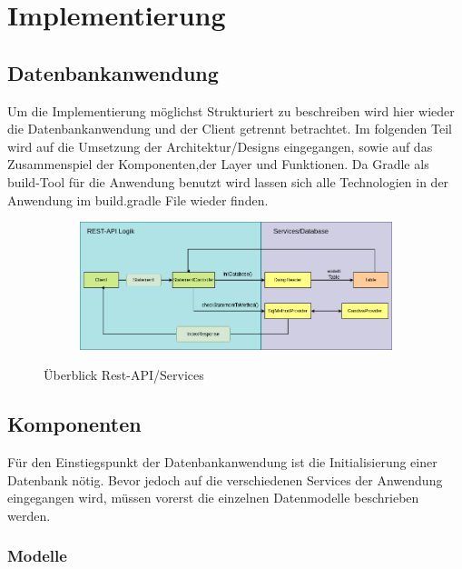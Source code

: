 \chapter{Implementierung}


\section{Datenbankanwendung}

Um die Implementierung möglichst Strukturiert zu beschreiben wird hier wieder die Datenbankanwendung und der Client getrennt betrachtet.
Im folgenden Teil wird auf die Umsetzung der Architektur/Designs eingegangen, sowie auf das Zusammenspiel der Komponenten,der Layer und Funktionen.
Da Gradle als build-Tool für die Anwendung benutzt wird lassen sich alle Technologien in der Anwendung im build.gradle File wieder finden. 

\begin{figure}[h]
  \centering
  \begin{subfigure}[b]{1.0\textwidth}
    \includegraphics[width=1.0\linewidth]{img/logic}
  \end{subfigure}
  \caption{Überblick Rest-API/Services}
  \label{graf_3}
\end{figure}

\section{Komponenten}

Für den Einstiegspunkt der Datenbankanwendung ist die Initialisierung einer Datenbank nötig. Bevor jedoch auf die verschiedenen Services der Anwendung eingegangen wird, müssen vorerst die einzelnen Datenmodelle beschrieben werden. 

\subsection{Modelle}
\label{Modelle}

